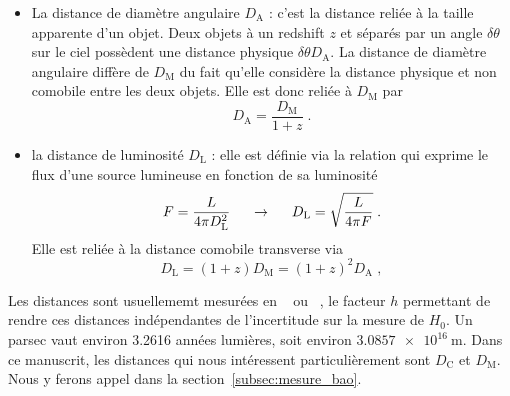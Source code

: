 \begin{itemize}[label=$\bullet$]
\item La distance de diamètre angulaire $D_{\mathrm{A}}$ : c'est la distance reliée à la taille apparente d'un objet. Deux objets à un redshift $z$ et séparés par un angle $\delta \theta$ sur le ciel possèdent une distance physique $\delta \theta D_{\mathrm{A}}$. La distance de diamètre angulaire diffère de $D_{\mathrm{M}}$ du fait qu'elle considère la distance physique et non comobile entre les deux objets. Elle est donc reliée à $D_{\mathrm{M}}$ par
  \begin{equation}
    \label{eq:dist_ang}
    D_{\mathrm{A}} = \frac{D_{\mathrm{M}}}{1+z}  \; .
  \end{equation}

\item la distance de luminosité $D_{\mathrm{L}}$ : elle est définie via la relation qui exprime le flux d'une source lumineuse en fonction de sa luminosité
  \begin{equation}
    \label{eq:dist_lum}
    F = \frac{L}{4\pi D_{\mathrm{L}}^2} \hspace{0.5cm} \rightarrow \hspace{0.5cm} D_{\mathrm{L}} = \sqrt{\frac{L}{4 \pi F}}  \; .
  \end{equation}
  Elle est reliée à la distance comobile transverse via
  \begin{equation}
    D_{\mathrm{L}} = (1+z) D_{\mathrm{M}} = (1+z)^2 D_{\mathrm{A}}  \; ,
  \end{equation}
\end{itemize}

Les distances sont usuellememt mesurées en \si{\perh\kpc} ou \si{\perh\Mpc}, le facteur $h$ permettant de rendre ces distances indépendantes de l'incertitude sur la mesure de $H_{0}$. Un parsec vaut environ \num{3.2616} années lumières, soit environ $\SI{3,0857 e16}{\meter}$.
Dans ce manuscrit, les distances qui nous intéressent particulièrement sont $D_{\mathrm{C}}$ et $D_{\mathrm{M}}$. Nous y ferons appel dans la section~\ref{subsec:mesure_bao}.

